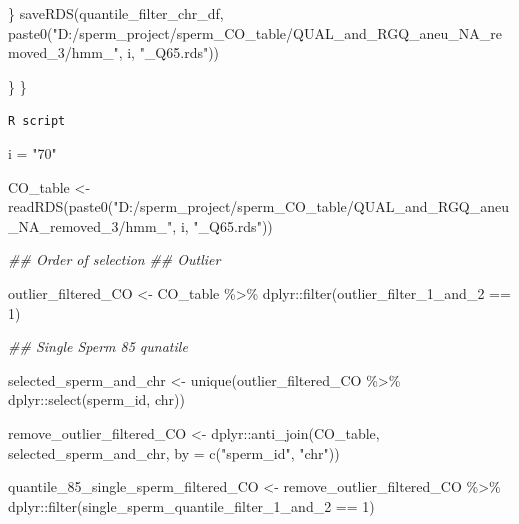 \documentclass[
  letterpaper,
  DIV=11,
  numbers=noendperiod]{scrreprt}
\newenvironment{Shaded}{\begin{snugshade}}{\end{snugshade}}
\newcommand{\AttributeTok}[1]{\textcolor[rgb]{0.40,0.45,0.13}{#1}}
\newcommand{\DecValTok}[1]{\textcolor[rgb]{0.68,0.00,0.00}{#1}}
\newcommand{\DocumentationTok}[1]{\textcolor[rgb]{0.37,0.37,0.37}{\textit{#1}}}
\newcommand{\FunctionTok}[1]{\textcolor[rgb]{0.28,0.35,0.67}{#1}}
\newcommand{\NormalTok}[1]{\textcolor[rgb]{0.00,0.23,0.31}{#1}}
\newcommand{\OtherTok}[1]{\textcolor[rgb]{0.00,0.23,0.31}{#1}}
\newcommand{\SpecialCharTok}[1]{\textcolor[rgb]{0.37,0.37,0.37}{#1}}
\newcommand{\StringTok}[1]{\textcolor[rgb]{0.13,0.47,0.30}{#1}}
\begin{document}
\begin{codelisting}
\begin{Shaded}
\begin{Highlighting}[]
\NormalTok{    \}}
    \FunctionTok{saveRDS}\NormalTok{(quantile\_filter\_chr\_df, }\FunctionTok{paste0}\NormalTok{(}\StringTok{"D:/sperm\_project/sperm\_CO\_table/QUAL\_and\_RGQ\_aneu\_NA\_removed\_3/hmm\_"}\NormalTok{, i, }\StringTok{"\_Q65.rds"}\NormalTok{))}

\NormalTok{  \}}
\NormalTok{\}}
\end{Highlighting}
\end{Shaded}

\end{codelisting}

\begin{codelisting}

\caption{\texttt{R script}}

\begin{Shaded}
\begin{Highlighting}[]
\NormalTok{i }\OtherTok{=} \StringTok{"70"}

\NormalTok{CO\_table }\OtherTok{\textless{}{-}} \FunctionTok{readRDS}\NormalTok{(}\FunctionTok{paste0}\NormalTok{(}\StringTok{"D:/sperm\_project/sperm\_CO\_table/QUAL\_and\_RGQ\_aneu\_NA\_removed\_3/hmm\_"}\NormalTok{, i, }\StringTok{"\_Q65.rds"}\NormalTok{))}

\DocumentationTok{\#\# Order of selection}
\DocumentationTok{\#\# Outlier}

\NormalTok{outlier\_filtered\_CO }\OtherTok{\textless{}{-}}\NormalTok{ CO\_table }\SpecialCharTok{\%\textgreater{}\%}\NormalTok{ dplyr}\SpecialCharTok{::}\FunctionTok{filter}\NormalTok{(outlier\_filter\_1\_and\_2 }\SpecialCharTok{==} \DecValTok{1}\NormalTok{)}


\DocumentationTok{\#\# Single Sperm 85 qunatile}

\NormalTok{selected\_sperm\_and\_chr }\OtherTok{\textless{}{-}} \FunctionTok{unique}\NormalTok{(outlier\_filtered\_CO }\SpecialCharTok{\%\textgreater{}\%}\NormalTok{ dplyr}\SpecialCharTok{::}\FunctionTok{select}\NormalTok{(sperm\_id, chr))}

\NormalTok{remove\_outlier\_filtered\_CO }\OtherTok{\textless{}{-}}\NormalTok{ dplyr}\SpecialCharTok{::}\FunctionTok{anti\_join}\NormalTok{(CO\_table, selected\_sperm\_and\_chr, }\AttributeTok{by =} \FunctionTok{c}\NormalTok{(}\StringTok{"sperm\_id"}\NormalTok{, }\StringTok{"chr"}\NormalTok{))}

\NormalTok{quantile\_85\_single\_sperm\_filtered\_CO }\OtherTok{\textless{}{-}}\NormalTok{ remove\_outlier\_filtered\_CO }\SpecialCharTok{\%\textgreater{}\%}\NormalTok{ dplyr}\SpecialCharTok{::}\FunctionTok{filter}\NormalTok{(single\_sperm\_quantile\_filter\_1\_and\_2 }\SpecialCharTok{==} \DecValTok{1}\NormalTok{)}



\end{Highlighting}
\end{Shaded}
\end{codelisting}
\end{document}

